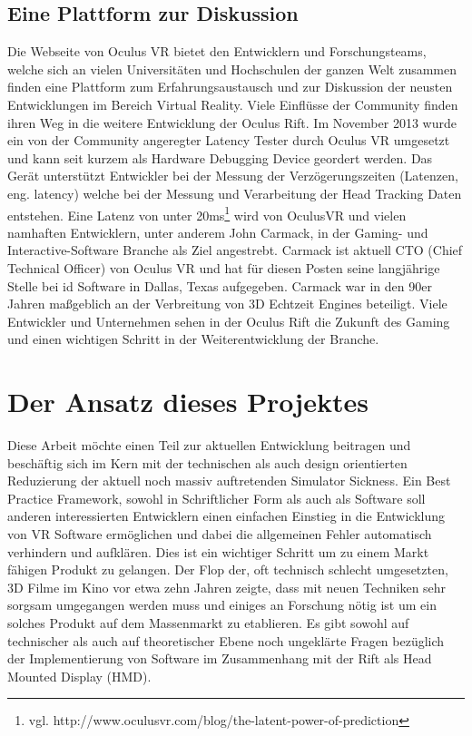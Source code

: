 \documentclass[pagesize, paper=a4, fontsize=12pt,titlepage=true, headings=small, headnosepline, abstractoff, liststotoc, nochapterprefix, plainheadsepline]{scrreprt}
\begin{document}
\subsection{Eine Plattform zur Diskussion}
Die Webseite von Oculus VR bietet den Entwicklern und Forschungsteams, welche sich an vielen Universitäten und Hochschulen der ganzen Welt zusammen finden eine Plattform zum Erfahrungsaustausch und zur Diskussion der neusten Entwicklungen im Bereich Virtual Reality. Viele Einflüsse der Community finden ihren Weg in die weitere Entwicklung der Oculus Rift. Im November 2013 wurde ein von der Community angeregter Latency Tester durch Oculus VR umgesetzt und kann seit kurzem als Hardware Debugging Device geordert werden. Das Gerät unterstützt Entwickler bei der Messung der Verzögerungszeiten (Latenzen, eng. latency) welche bei der Messung und Verarbeitung der Head Tracking Daten entstehen. Eine Latenz von unter 20ms\footnote{vgl. http://www.oculusvr.com/blog/the-latent-power-of-prediction} wird von OculusVR und vielen namhaften Entwicklern, unter anderem John Carmack, in der Gaming- und Interactive-Software Branche als Ziel angestrebt. Carmack ist aktuell CTO (Chief Technical Officer) von Oculus VR und hat für diesen Posten seine langjährige Stelle bei id Software in Dallas, Texas aufgegeben. Carmack war in den 90er Jahren maßgeblich an der Verbreitung von 3D Echtzeit Engines beteiligt. Viele Entwickler und Unternehmen sehen in der Oculus Rift die Zukunft des Gaming und einen wichtigen Schritt in der Weiterentwicklung der Branche.


\section{Der Ansatz dieses Projektes}
Diese Arbeit möchte einen Teil zur aktuellen Entwicklung beitragen und beschäftig sich im Kern mit der technischen als auch design orientierten Reduzierung der aktuell noch massiv auftretenden Simulator Sickness. Ein Best Practice Framework, sowohl in Schriftlicher Form als auch als Software soll anderen interessierten Entwicklern einen einfachen Einstieg in die Entwicklung von VR Software ermöglichen und dabei die allgemeinen Fehler automatisch verhindern und aufklären. Dies ist ein wichtiger Schritt um zu einem Markt fähigen Produkt zu gelangen. Der Flop der, oft technisch schlecht umgesetzten, 3D Filme im Kino vor etwa zehn Jahren zeigte, dass mit neuen Techniken sehr sorgsam umgegangen werden muss und einiges an Forschung nötig ist um ein solches Produkt auf dem Massenmarkt zu etablieren. Es gibt sowohl auf technischer als auch auf theoretischer Ebene noch ungeklärte Fragen bezüglich der Implementierung von Software im Zusammenhang mit der Rift als Head Mounted Display (HMD).
\end{document}
